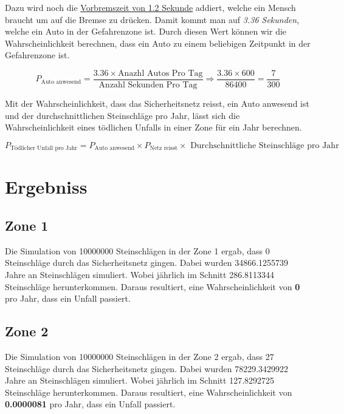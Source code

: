 \documentclass[
  letterpaper,
  DIV=11,
  numbers=noendperiod]{scrartcl}
\begin{document}
Dazu wird noch die
\href{https://www.adac.de/verkehr/rund-um-den-fuehrerschein/erwerb/reaktionsweg-berechnen/}{Vorbremszeit
von 1.2 Sekunde} addiert, welche ein Mensch braucht um auf die Bremse zu
drücken. Damit kommt man auf \emph{3.36 Sekunden}, welche ein Auto in
der Gefahrenzone ist. Durch diesen Wert können wir die
Wahrscheinlichkeit berechnen, dass ein Auto zu einem beliebigen
Zeitpunkt in der Gefahrenzone ist.

\[
P_{\text{Auto anwesend}} = \frac{3.36 \times \text{Anazhl Autos Pro Tag}}{\text{Anzahl Sekunden Pro Tag}} \Rightarrow \frac{3.36 \times 600}{86400} = \frac{7}{300}
\]

Mit der Wahrscheinlichkeit, dass das Sicherheitsnetz reisst, ein Auto
anwesend ist und der durchschnittlichen Steinschläge pro Jahr, lässt
sich die Wahrscheinlichkeit eines tödlichen Unfalls in einer Zone für
ein Jahr berechnen.

\[
P_{\text{Tödlicher Unfall pro Jahr}} = P_{\text{Auto anwesend}} \times P_{\text{Netz reisst}} \times \text{ Durchschnittliche Steinschläge pro Jahr}
\]

\newpage

\section{Ergebniss}\label{ergebniss}

\subsection{Zone 1}\label{zone-1}

Die Simulation von 10000000 Steinschlägen in der Zone 1 ergab, dass 0
Steinschläge durch das Sicherheitsnetz gingen. Dabei wurden
34866.1255739 Jahre an Steinschlägen simuliert. Wobei jährlich im
Schnitt 286.8113344 Steinschläge herunterkommen. Daraus resultiert, eine
Wahrscheinlichkeit von \textbf{0} pro Jahr, dass ein Unfall passiert.

\subsection{Zone 2}\label{zone-2}

Die Simulation von 10000000 Steinschlägen in der Zone 2 ergab, dass 27
Steinschläge durch das Sicherheitsnetz gingen. Dabei wurden
78229.3429922 Jahre an Steinschlägen simuliert. Wobei jährlich im
Schnitt 127.8292725 Steinschläge herunterkommen. Daraus resultiert, eine
Wahrscheinlichkeit von \textbf{0.0000081} pro Jahr, dass ein Unfall
passiert.
\end{document}
